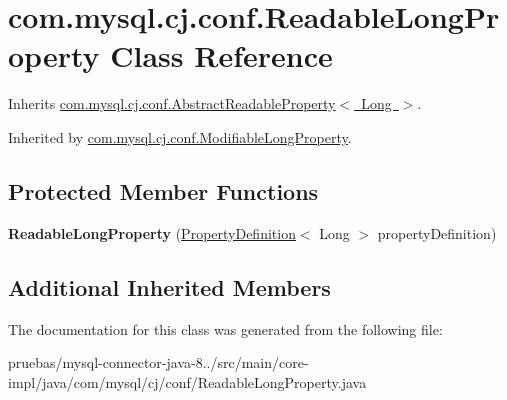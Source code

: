 \hypertarget{classcom_1_1mysql_1_1cj_1_1conf_1_1_readable_long_property}{}\section{com.\+mysql.\+cj.\+conf.\+Readable\+Long\+Property Class Reference}
\label{classcom_1_1mysql_1_1cj_1_1conf_1_1_readable_long_property}


Inherits \mbox{\hyperlink{classcom_1_1mysql_1_1cj_1_1conf_1_1_abstract_readable_property}{com.\+mysql.\+cj.\+conf.\+Abstract\+Readable\+Property$<$ Long $>$}}.



Inherited by \mbox{\hyperlink{classcom_1_1mysql_1_1cj_1_1conf_1_1_modifiable_long_property}{com.\+mysql.\+cj.\+conf.\+Modifiable\+Long\+Property}}.

\subsection*{Protected Member Functions}
\begin{DoxyCompactItemize}
\item 
\mbox{\label{classcom_1_1mysql_1_1cj_1_1conf_1_1_readable_long_property_ad017e75f23c837057d9cce310b54aa38}} 
{\bfseries Readable\+Long\+Property} (\mbox{\hyperlink{interfacecom_1_1mysql_1_1cj_1_1conf_1_1_property_definition}{Property\+Definition}}$<$ Long $>$ property\+Definition)
\end{DoxyCompactItemize}
\subsection*{Additional Inherited Members}


The documentation for this class was generated from the following file\+:\begin{DoxyCompactItemize}
\item 
pruebas/mysql-\/connector-\/java-\/8../src/main/core-\/impl/java/com/mysql/cj/conf/Readable\+Long\+Property.\+java\end{DoxyCompactItemize}

